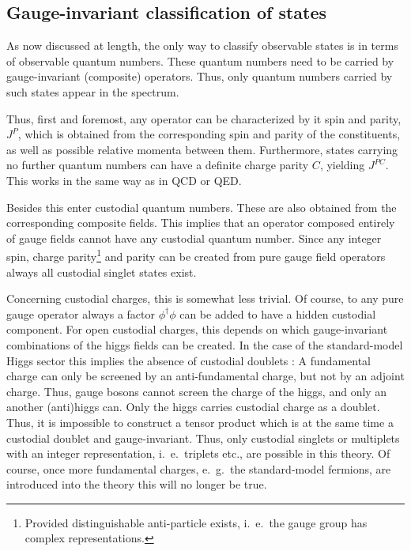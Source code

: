 \documentclass[final,12pt,3p,longtitle]{elsarticle}
\newcommand*{\1}{1\!\!\!\bot}
\begin{document}
\subsection{Gauge-invariant classification of states}\label{ss:classification}

As now discussed at length, the only way to classify observable states is in terms of observable quantum numbers. These quantum numbers need to be carried by gauge-invariant (composite) operators. Thus, only quantum numbers carried by such states appear in the spectrum.

Thus, first and foremost, any operator can be characterized by it spin and parity, $J^P$, which is obtained from the corresponding spin and parity of the constituents, as well as possible relative momenta between them. Furthermore, states carrying no further quantum numbers can have a definite charge parity $C$, yielding $J^{PC}$. This works in the same way as in QCD or QED.

Besides this enter custodial quantum numbers. These are also obtained from the corresponding composite fields. This implies that an operator composed entirely of gauge fields cannot have any custodial quantum number. Since any integer spin, charge parity\footnote{Provided distinguishable anti-particle exists, i.\ e.\ the gauge group has complex representations.} and parity can be created from pure gauge field operators \cite{Chen:2005mg} always all custodial singlet states exist.

Concerning custodial charges, this is somewhat less trivial. Of course, to any pure gauge operator always a factor $\phi^\dagger\phi$ can be added to have a hidden custodial component. For open custodial charges, this depends on which gauge-invariant combinations of the higgs fields can be created. In the case of the standard-model Higgs sector this implies the absence of custodial doublets \cite{Wurtz:2013ova,Maas:2014pba}: A fundamental charge can only be screened by an anti-fundamental charge, but not by an adjoint charge. Thus, gauge bosons cannot screen the charge of the higgs, and only an another (anti)higgs can. Only the higgs carries custodial charge as a doublet. Thus, it is impossible to construct a tensor product which is at the same time a custodial doublet and gauge-invariant. Thus, only custodial singlets or multiplets with an integer representation, i.\ e.\ triplets etc., are possible in this theory. Of course, once more fundamental charges, e.\ g.\ the standard-model fermions, are introduced into the theory this will no longer be true.
\end{document}
